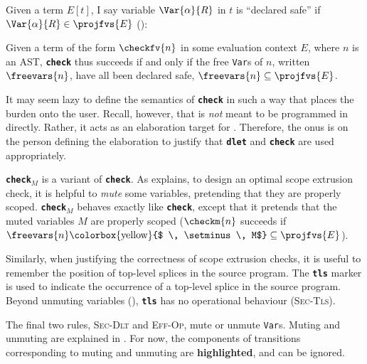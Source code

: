 Given a term $E[t]$, I say variable $\Var{\alpha}{R}$ in $t$ is ``declared safe'' if $\Var{\alpha}{R} \in \projfvs{E}$ ():

Given a term of the form $\checkfv{n}$ in some evaluation context $E$, where $n$ is an AST, \textbf{\texttt{check}} thus succeeds if and only if the free \texttt{Var}s of $n$, written $\freevars{n}$, have all been declared safe, $\freevars{n} \subseteq \projfvs{E}$. 

It may seem lazy to define the semantics of \textbf{\texttt{check}} in such a way that places the burden onto the user. Recall, however, that \coreLang{} is \textit{not} meant to be programmed in directly. Rather, it acts as an elaboration target for \sourceLang{}. Therefore, the onus is on the person defining the elaboration to justify that \textbf{\texttt{dlet}} and \textbf{\texttt{check}} are used appropriately. 

\textbf{\texttt{check}}$_M$ is a variant of \textbf{\texttt{check}}. As  explains, to design an optimal scope extrusion check, it is helpful to \textit{mute} some variables, pretending that they are properly scoped. \textbf{\texttt{check}}$_M$ behaves exactly like \textbf{\texttt{check}}, except that it pretends that the muted variables $M$ are properly scoped ($\checkm{n}$ succeeds if $\freevars{n} \text{\colorbox{yellow}{$ \, \setminus \, M$}} \subseteq \projfvs{E}$).

Similarly, when justifying the correctness of scope extrusion checks, it is useful to remember the position of top-level splices in the \sourceLang{} source program. The \textbf{\texttt{tls}} marker is used to indicate the occurrence of a top-level splice in the source program. Beyond unmuting variables (), \textbf{\texttt{tls}} has no operational behaviour (\textsc{Sec-Tls}).

The final two rules, \textsc{Sec-Dlt} and \textsc{Eff-Op}, mute or unmute \texttt{Var}s. Muting and unmuting are explained in . For now, the components of transitions corresponding to muting and unmuting are \textbf{\textcolor{coreHighlight}{highlighted}}, and can be ignored. 

